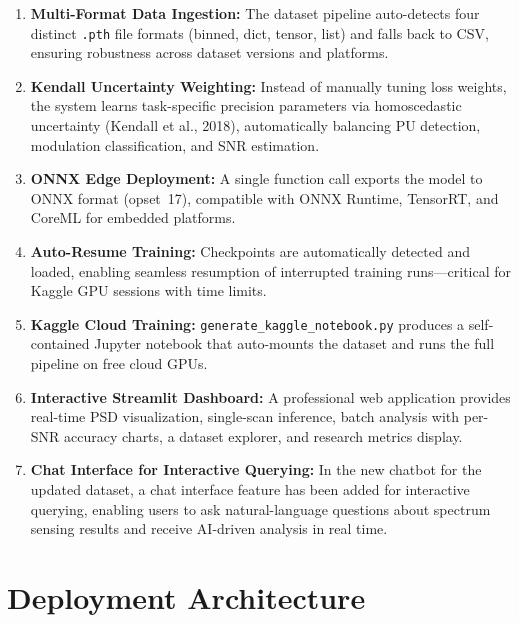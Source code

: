 \documentclass[12pt,a4paper]{article}
\begin{document}
\begin{enumerate}[leftmargin=1.5em]
\item \textbf{Multi-Format Data Ingestion:} The dataset pipeline auto-detects four distinct \texttt{.pth} file formats (binned, dict, tensor, list) and falls back to CSV, ensuring robustness across dataset versions and platforms.

\item \textbf{Kendall Uncertainty Weighting:} Instead of manually tuning loss weights, the system learns task-specific precision parameters via homoscedastic uncertainty (Kendall et al., 2018), automatically balancing PU detection, modulation classification, and SNR estimation.

\item \textbf{ONNX Edge Deployment:} A single function call exports the model to ONNX format (opset~17), compatible with ONNX Runtime, TensorRT, and CoreML for embedded platforms.

\item \textbf{Auto-Resume Training:} Checkpoints are automatically detected and loaded, enabling seamless resumption of interrupted training runs---critical for Kaggle GPU sessions with time limits.

\item \textbf{Kaggle Cloud Training:} \texttt{generate\_kaggle\_notebook.py} produces a self-contained Jupyter notebook that auto-mounts the dataset and runs the full pipeline on free cloud GPUs.

\item \textbf{Interactive Streamlit Dashboard:} A professional web application provides real-time PSD visualization, single-scan inference, batch analysis with per-SNR accuracy charts, a dataset explorer, and research metrics display.

\item \textbf{Chat Interface for Interactive Querying:} In the new chatbot for the updated dataset, a chat interface feature has been added for interactive querying, enabling users to ask natural-language questions about spectrum sensing results and receive AI-driven analysis in real time.
\end{enumerate}

\section{Deployment Architecture}
\end{document}
